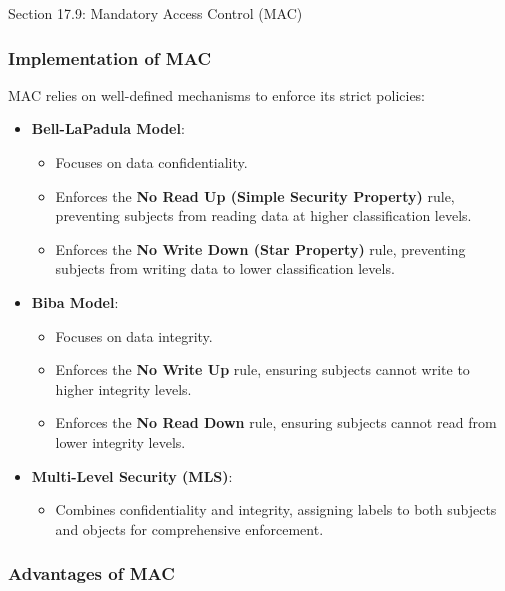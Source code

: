 \begin{notes}{Section 17.9: Mandatory Access Control (MAC)}
    \subsubsection*{Implementation of MAC}
    
    MAC relies on well-defined mechanisms to enforce its strict policies:
    \begin{itemize}
        \item \textbf{Bell-LaPadula Model}:
        \begin{itemize}
            \item Focuses on data confidentiality.
            \item Enforces the \textbf{No Read Up (Simple Security Property)} rule, preventing subjects from reading data at higher classification levels.
            \item Enforces the \textbf{No Write Down (Star Property)} rule, preventing subjects from writing data to lower classification levels.
        \end{itemize}
        \item \textbf{Biba Model}:
        \begin{itemize}
            \item Focuses on data integrity.
            \item Enforces the \textbf{No Write Up} rule, ensuring subjects cannot write to higher integrity levels.
            \item Enforces the \textbf{No Read Down} rule, ensuring subjects cannot read from lower integrity levels.
        \end{itemize}
        \item \textbf{Multi-Level Security (MLS)}:
        \begin{itemize}
            \item Combines confidentiality and integrity, assigning labels to both subjects and objects for comprehensive enforcement.
        \end{itemize}
    \end{itemize}
    
    \subsubsection*{Advantages of MAC}
    

\end{notes}
